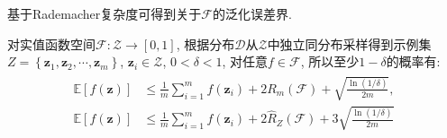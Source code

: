 基于Rademacher复杂度可得到关于$\mathcal{F}$的泛化误差界. 

\begin{theorem}\label{thm:6}
对实值函数空间$\mathcal{F}: \mathcal{Z}\rightarrow [0,1]$, 根据分布$\mathcal{D}$从$\mathcal{Z}$中独立同分布采样得到示例集$Z=\left\{\boldsymbol{z}_1,\boldsymbol{z}_2,\cdots,\boldsymbol{z}_m\right\}$, $\boldsymbol{z}_i\in \mathcal{Z}$, $0<\delta<1$, 对任意$f\in \mathcal{F}$, 所以至少$1-\delta$的概率有:
\begin{eqnarray}
\begin{aligned}
\mathbb{E}\left[ f\left( \boldsymbol{z} \right) \right] &\le \frac{1}{m}\sum_{i=1}^m{f\left( \boldsymbol{z}_i \right)}+2R_m\left( \mathcal{F} \right) +\sqrt{\frac{\ln \left( 1/\delta \right)}{2m}},\\
\mathbb{E}\left[ f\left( \boldsymbol{z} \right) \right] &\le \frac{1}{m}\sum_{i=1}^m{f\left( \boldsymbol{z}_i \right)}+2\hat{R}_Z\left( \mathcal{F} \right) +3\sqrt{\frac{\ln \left( 1/\delta \right)}{2m}}
\end{aligned}
\end{eqnarray}
\end{theorem}

